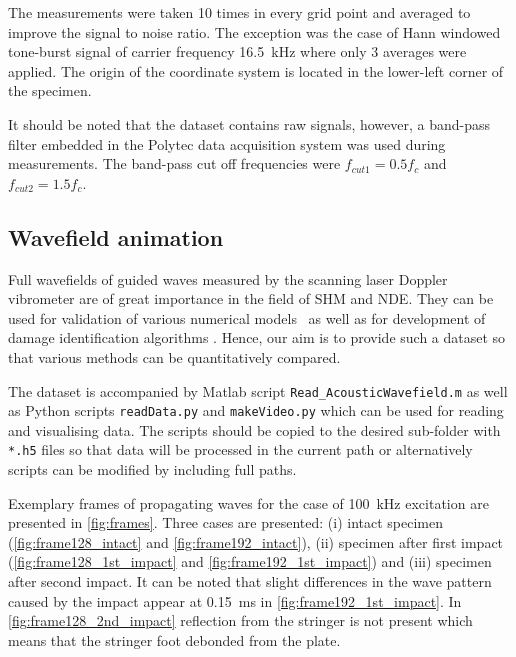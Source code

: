 \documentclass[times,final]{elsarticle}
\begin{document}
The measurements were taken \num{10} times in every grid point and averaged to improve the signal to noise ratio.
The exception was the case of Hann windowed tone-burst signal of carrier frequency \SI{16.5}{\kilo\hertz} where only \num{3} averages were applied.
The origin of the coordinate system is located in the lower-left corner of the specimen.

It should be noted that the dataset contains raw signals, however, a band-pass filter embedded in the Polytec data acquisition system was used during measurements.
The band-pass cut off frequencies were \(f_{cut1} = \num{0.5}f_c \) and \(f_{cut2} = \num{1.5}f_c \).

\subsection{Wavefield animation}
{\color{red}Full wavefields of guided waves measured by the scanning laser Doppler vibrometer are of great importance in the field of SHM and NDE. They can be used for validation of various numerical models~\cite{Shen2016,Kudela2020a} as well as for development of damage identification algorithms \cite{Radzienski2011,ROGGE2013,MESNIL2015,LUGOVTSOVA2021,Staszewski2012}. Hence, our aim is to provide such a dataset so that various methods can be quantitatively compared.}

The dataset is accompanied by Matlab script \verb+Read_AcousticWavefield.m+ as well as Python scripts \verb+readData.py+ and \verb+makeVideo.py+ which can be used for reading and visualising data. The scripts should be copied to the desired sub-folder with \verb+*.h5+ files so that data will be processed in the current path or alternatively scripts can be modified by including full paths.

Exemplary frames of propagating waves for the case of \SI{100}{\kilo\hertz} excitation are presented in \autoref{fig:frames}.
Three cases are presented: (i) intact specimen (\autoref{fig:frame128_intact} and \autoref{fig:frame192_intact}), (ii) specimen after first impact (\autoref{fig:frame128_1st_impact} and \autoref{fig:frame192_1st_impact}) and (iii) specimen after second impact.
It can be noted that slight differences in the wave pattern caused by the impact appear at \SI{0.15}{\milli\second} in \autoref{fig:frame192_1st_impact}.
In \autoref{fig:frame128_2nd_impact} reflection from the stringer is not present which means that the stringer foot debonded from the plate.
\end{document}
